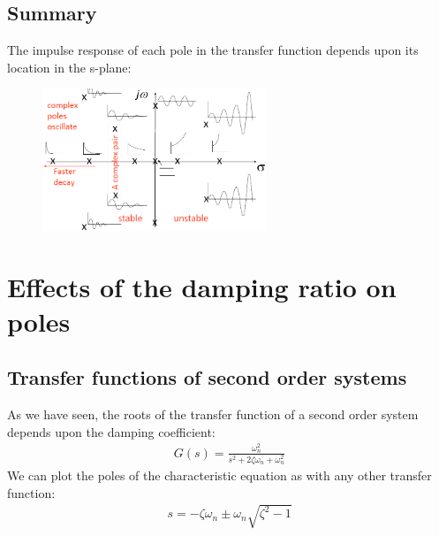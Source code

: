 \documentclass[class=report, crop=false, 12pt,a4paper]{standalone}
\begin{document}
\subsection{Summary}
The impulse response of each pole in the transfer function depends upon its location in the s-plane:
\begin{figure}[H]
  \centering
  \includegraphics[width = 0.6\textwidth]{../img/diagram93.png}
  \caption{}
\end{figure}
\section{Effects of the damping ratio on poles}
\subsection{Transfer functions of second order systems}
As we have seen, the roots of the transfer function of a second order system depends upon the damping coefficient:
\begin{align}
  G(s) = \frac{\omega_n^2}{s^2 + 2 \zeta \omega_n + \omega_n^2}
\end{align}
We can plot the poles of the characteristic equation as with any other transfer function:
\begin{align}
  s = -\zeta \omega_n \pm \omega_n \sqrt{\zeta^2 - 1}
\end{align}
\end{document}
